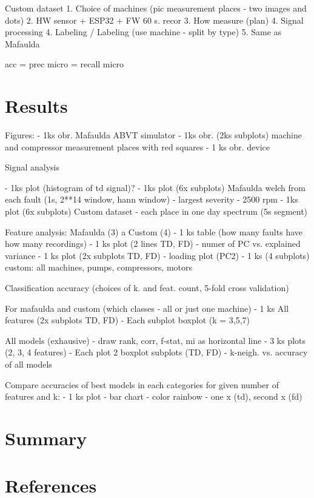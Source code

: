 \documentclass{llncs}
\begin{document}
Custom dataset
1. Choice of machines (pic measurement places - two images and dots)
2. HW sensor + ESP32 + FW 60 s. recor
3. How measure (plan)
4. Signal processing
4. Labeling  / Labeling (use machine - split by type) 
5. Same as Mafaulda

acc = prec micro = recall micro



\section{Results}


Figures:
- 1ks obr. Mafaulda ABVT simulator
- 1ks obr. (2ks subplots) machine and compressor measurement places with red squares
- 1 ks obr. device 


Signal analysis

- 1ks plot (histogram of td signal)?
- 1ks plot (6x subplots) Mafaulda welch from each fault (1s, 2**14 window, hann window)  - largest severity - 2500 rpm
- 1ks plot (6x subplots) Custom dataset - each place in one day spectrum (5s segment)

Feature analysis:
Mafaulda (3) a Custom (4) 
- 1 ks table (how many faults have how many recordings)
- 1 ks plot (2 lines TD, FD) - numer of PC vs. explained variance
- 1 ks plot (2x subplots TD, FD) - loading plot (PC2)
- 1 ks (4 subplots) custom: all machines, pumps, compressors, motors


Classification accuracy (choices of k. and feat. count, 5-fold cross validation)

For mafaulda and custom (which classes - all or just one machine)
- 1 ks All features (2x subplots TD, FD)
	- Each subplot boxplot (k = 3,5,7)

All models (exhausive) - draw rank, corr, f-stat, mi as horizontal line
	- 3 ks plots (2, 3, 4 features)
		- Each plot 2 boxplot subplots (TD, FD) - k-neigh. vs. accuracy of all models


Compare accuracies of best models in each categories for given number of features and k:
- 1 ks plot - bar chart - color rainbow - one x (td), second x (fd)



\section{Summary}

\section{References}
\end{document}
